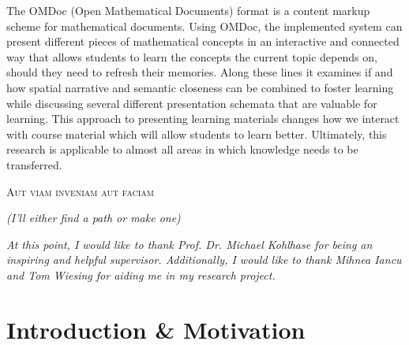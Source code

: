 \documentclass[twoside, 12pt]{article}
\begin{document}
The OMDoc (Open Mathematical Documents) format \cite{Kohlhase:OMDoc1.2} is a content markup scheme for mathematical documents. Using OMDoc, the implemented system can present different pieces of mathematical concepts in an interactive and connected way that allows students to learn the concepts the current topic depends on, should they need to refresh their memories. Along these lines it examines if and how spatial narrative and semantic closeness can be combined to foster learning while discussing several different presentation schemata that are valuable for learning. This approach to presenting learning materials changes how we interact with course material which will allow students to learn better. Ultimately, this research is applicable to almost all areas in which knowledge needs to be transferred.\\ 

\newpage
\tableofcontents

\clearpage
{}

\newpage
\thispagestyle{empty}
\vspace*{\fill}
\begin{center}
\textsc{Aut viam inveniam aut faciam}\\

\vspace*{1cm}

\textit{(I'll either find a path or make one)}\\

\vspace*{4cm}

\centering

\begin{quoting}
\begin{center}
\noindent
\textit{At this point, I would like to thank Prof. Dr. Michael Kohlhase for being an inspiring and helpful supervisor. Additionally, I would like to thank Mihnea Iancu and Tom Wiesing for aiding me in my research project.\\}
\end{center}
\end{quoting}

\vspace*{\fill}
\end{center}

\newpage

\section{Introduction \& Motivation}
\label{sec:introduction}
\end{document}

